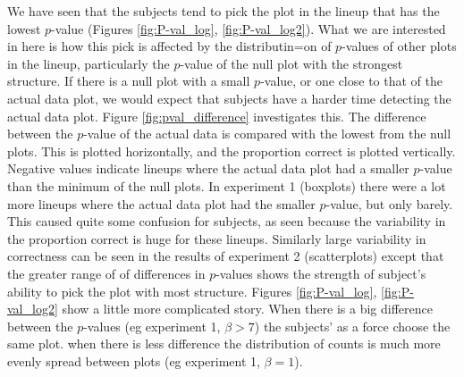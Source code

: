 \documentclass[12pt]{article}
\newcommand{\blue}[1]{{\color{blue} #1}} %
\begin{document}
We have seen that the subjects tend to pick the plot in the lineup that has the lowest $p$-value (Figures \ref{fig:P-val_log}, \ref{fig:P-val_log2}). What we are interested in here is how this pick is affected by the distributin=on of $p$-values of other plots in the lineup, particularly the $p$-value of the null plot with the strongest structure. If there is a null plot with a small $p$-value, or one close to that of the actual data plot, we would expect that subjects have a harder time detecting the actual data plot. Figure \ref{fig:pval_difference} investigates this. The difference between the $p$-value of the actual data is compared with the lowest from the null plots. This is plotted horizontally, and the proportion correct is plotted vertically. Negative values indicate lineups where the actual data plot had a smaller $p$-value than the minimum of the null plots. In experiment 1 (boxplots) there were a lot more lineups where the actual data plot had the smaller $p$-value, but only barely. This caused quite some confusion for subjects, as seen because the variability in the proportion correct is huge for these lineups. Similarly large variability in correctness can be seen in the results of experiment 2 (scatterplots) except that the greater range of of differences in $p$-values shows the strength of subject's ability to pick the plot with most structure. Figures \ref{fig:P-val_log}, \ref{fig:P-val_log2} show a little more complicated story. When there is a big difference between the $p$-values (eg experiment 1, $\beta>7$) the subjects' as a force choose the same plot. when there is less difference the distribution of counts is much more evenly spread between plots (eg experiment 1, $\beta=1$). 

\end{document}
